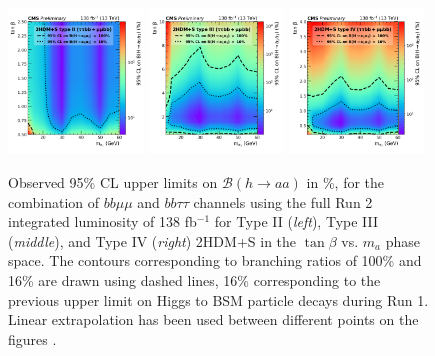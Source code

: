 \begin{figure}[h]
    \begin{center}
      \includegraphics[width=0.32\textwidth]{figures/ch-10-results/HAA_comb_II_prelim.pdf}
      \includegraphics[width=0.32\textwidth]{figures/ch-10-results/HAA_comb_III_prelim.pdf}
      \includegraphics[width=0.32\textwidth]{figures/ch-10-results/HAA_comb_IV_prelim.pdf}
    \end{center}
    \caption[Observed 95\% CL upper limits on $\mathcal{B}(h\to aa)$ in \%, for the combination of $bb\mu\mu$ and $bb\tau\tau$ channels using the full Run 2 integrated luminosity of 138 fb$^{-1}$ for Type II (\textit{left}), Type III (\textit{middle}), and Type IV (\textit{right}) 2HDM+S in the $\tan\beta$ vs. $m_a$ phase space.]{Observed 95\% CL upper limits on $\mathcal{B}(h\to aa)$ in \%, for the combination of $bb\mu\mu$ and $bb\tau\tau$ channels using the full Run 2 integrated luminosity of 138 fb$^{-1}$ for Type II (\textit{left}), Type III (\textit{middle}), and Type IV (\textit{right}) 2HDM+S in the $\tan\beta$ vs. $m_a$ phase space. The contours corresponding to branching ratios of 100\% and 16\% are drawn using dashed lines, 16\% corresponding to the previous upper limit on Higgs to BSM particle decays during Run 1. Linear extrapolation has been used between different points on the figures \cite{CMS-AN-20-213}.}
      \label{fig:results_limits_combined_2D}
  \end{figure}
  

